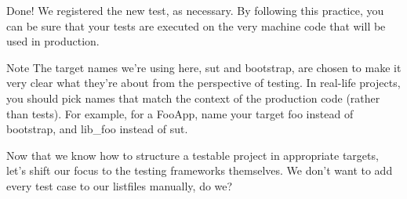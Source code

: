 Done! We registered the new test, as necessary. By following this practice, you can be sure that your tests are executed on the very machine code that will be used in production.

\begin{myNotic}{Note}
The target names we’re using here, sut and bootstrap, are chosen to make it very clear what they’re about from the perspective of testing. In real-life projects, you should pick names that match the context of the production code (rather than tests). For example, for a FooApp, name your target foo instead of bootstrap, and lib\_foo instead of sut.
\end{myNotic}

Now that we know how to structure a testable project in appropriate targets, let’s shift our focus to the testing frameworks themselves. We don’t want to add every test case to our listfiles manually, do we?








































